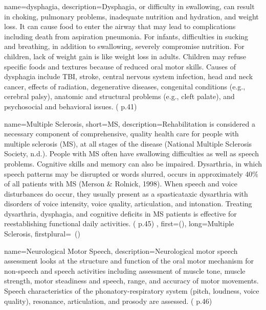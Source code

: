  {
	name={dysphagia}, 
	description={Dysphagia, or difficulty in swallowing, can result in choking, pulmonary problems, inadequate nutrition and hydration, and weight loss. It can cause food to enter the airway that may lead to complications including death from aspiration pneumonia. For infants, difficulties in sucking and breathing, in addition to swallowing, severely compromise nutrition. For children, lack of weight gain is like weight loss in adults. Children may refuse specific foods and textures because of reduced oral motor skills. Causes of dysphagia include TBI, stroke, central nervous system infection, head and neck cancer, effects of radiation, degenerative diseases, congenital conditions (e.g., cerebral palsy), anatomic and structural problems (e.g., cleft palate), and psychosocial and behavioral issues. (\cite{SLPathologies} p.41)
}
}

 {
	name={Multiple Sclerosis}, 
	short={MS},
	description={Rehabilitation is considered a necessary component of comprehensive, quality health care for people with multiple sclerosis (MS), at all stages of the disease (National Multiple Sclerosis Society, n.d.). People with MS often have swallowing difficulties as well as speech problems. Cognitive skills and memory can also be impaired. Dysarthria, in which speech patterns may be disrupted or words slurred, occurs in approximately 40\% of all patients with MS (Merson & Rolnick, 1998). When speech and voice disturbances do occur, they usually present as a spasticataxic dysarthria with disorders of voice intensity, voice quality, articulation, and intonation. Treating dysarthria, dysphagia, and cognitive deficits in MS patients is effective for reestablishing functional daily activities. (\cite{SLPathologies} p.45)
},
first={}(),
	long={Multiple Sclerosis},
	firstplural={\glspluralsuffix\ (\glspluralsuffix )}
}

 {
	name={Neurological Motor Speech}, 
	description={Neurological motor speech assessment looks at the structure and function of the oral motor mechanism for non-speech and speech activities including assessment of muscle tone, muscle strength, motor steadiness and speech, range, and accuracy of motor movements. Speech characteristics of the phonatory-respiratory system (pitch, loudness, voice quality), resonance, articulation, and prosody are assessed. (\cite{SLPathologies} p.46)
}
}

